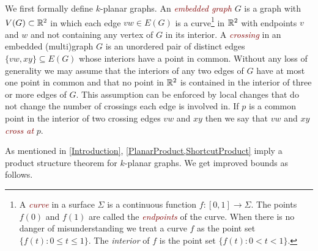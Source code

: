 \documentclass{patmorin}
\newcommand{\defin}[1]{\textcolor{Maroon}{\emph{#1}}}
\newcommand{\note}[2]{\noindent{\color{red}[#1:~#2]}}
\renewcommand{\le}{\leqslant}
\begin{document}
We first formally define $k$-planar graphs.  An \defin{embedded graph} $G$ is a graph with $V(G)\subset\mathbb{R}^2$ in which each edge $vw\in E(G)$ is a curve\footnote{A \defin{curve} in a surface $\Sigma$ is a continuous function $f:[0,1]\to \Sigma$. The points $f(0)$ and $f(1)$ are called the \defin{endpoints} of the curve.  When there is no danger of misunderstanding we treat a curve $f$ as the point set $\{f(t):0\le t\le 1\}$.  The \emph{interior} of $f$ is the point set $\{f(t):0<t<1\}$.} in $\mathbb{R}^2$ with endpoints $v$ and $w$ and not containing any vertex of $G$ in its interior.  A \defin{crossing} in an embedded (multi)graph $G$ is an unordered pair of distinct edges $\{vw,xy\}\subseteq E(G)$ whose interiors have a point in common. Without any loss of generality we may assume that the interiors of any two edges of $G$ have at most one point in common and that no point in $\mathbb{R}^2$ is contained in the interior of three or more edges of $G$.  This assumption can be enforced by local changes that do not change the number of crossings each edge is involved in.  If $p$ is a common point in the interior of two crossing edges $vw$ and $xy$ then we say that $vw$ and $xy$ \defin{cross at} $p$.




%

As mentioned in \cref{Introduction}, \cref{PlanarProduct,ShortcutProduct} imply a product structure theorem for $k$-planar graphs. We get improved bounds as follows.
\end{document}
